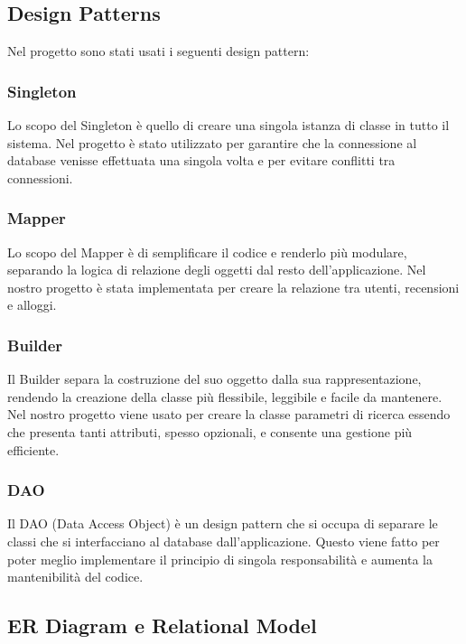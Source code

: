 \documentclass[10pt]{article}
\begin{document}
\subsection{Design Patterns}
Nel progetto sono stati usati i seguenti design pattern:
\subsubsection{Singleton}

Lo scopo del Singleton è quello di creare una singola istanza di classe in tutto il sistema. Nel progetto è stato utilizzato per garantire che la connessione al database venisse effettuata una singola volta e per evitare conflitti tra connessioni.

\subsubsection{Mapper}

Lo scopo del Mapper è di semplificare il codice e renderlo più modulare, separando la logica di relazione degli oggetti dal resto dell'applicazione. Nel nostro progetto è stata implementata per creare la relazione tra utenti, recensioni e alloggi.

\subsubsection{Builder}

Il Builder separa la costruzione del suo oggetto dalla sua rappresentazione, rendendo la creazione della classe più flessibile, leggibile e facile da mantenere. Nel nostro progetto viene usato per creare la classe parametri di ricerca essendo che presenta tanti attributi, spesso opzionali, e consente una gestione più efficiente.

\subsubsection{DAO}
\label{sezione 2.5.4.}
Il DAO (Data Access Object) è un design pattern che si occupa di separare le classi che si interfacciano al database dall'applicazione. Questo viene fatto
per poter meglio implementare il principio di singola responsabilità e aumenta
la mantenibilità del codice.

\subsection{ER Diagram e Relational Model}
\end{document}
